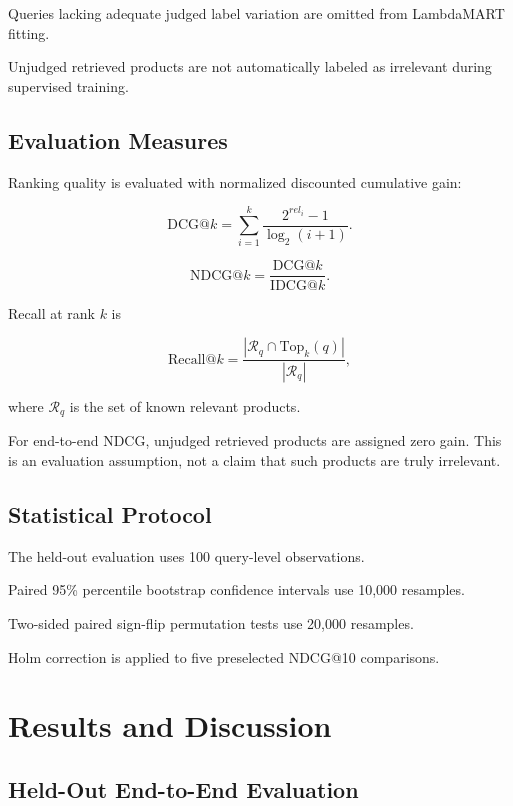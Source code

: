\documentclass[conference]{IEEEtran}
\begin{document}
Queries lacking adequate
judged label variation are omitted
from LambdaMART fitting.

Unjudged retrieved products are
not automatically labeled as
irrelevant during supervised training.

\subsection{Evaluation Measures}

Ranking quality is evaluated with
normalized discounted cumulative gain:

\begin{equation}
\mathrm{DCG}@k=
\sum_{i=1}^{k}
\frac{
2^{rel_i}-1
}{
\log_2(i+1)
}.
\end{equation}

\begin{equation}
\mathrm{NDCG}@k=
\frac{
\mathrm{DCG}@k
}{
\mathrm{IDCG}@k
}.
\end{equation}

Recall at rank $k$ is

\begin{equation}
\mathrm{Recall}@k=
\frac{
|\mathcal{R}_q\cap
\mathrm{Top}_k(q)|
}{
|\mathcal{R}_q|
},
\end{equation}

where $\mathcal{R}_q$ is the set
of known relevant products.

For end-to-end NDCG, unjudged
retrieved products are assigned
zero gain. This is an evaluation
assumption, not a claim that such
products are truly irrelevant.

\subsection{Statistical Protocol}

The held-out evaluation uses
100 query-level observations.

Paired 95\% percentile bootstrap
confidence intervals use
10,000 resamples.

Two-sided paired sign-flip
permutation tests use
20,000 resamples.

Holm correction is applied to
five preselected NDCG@10
comparisons.

\section{Results and Discussion}

\subsection{Held-Out End-to-End Evaluation}
\end{document}
